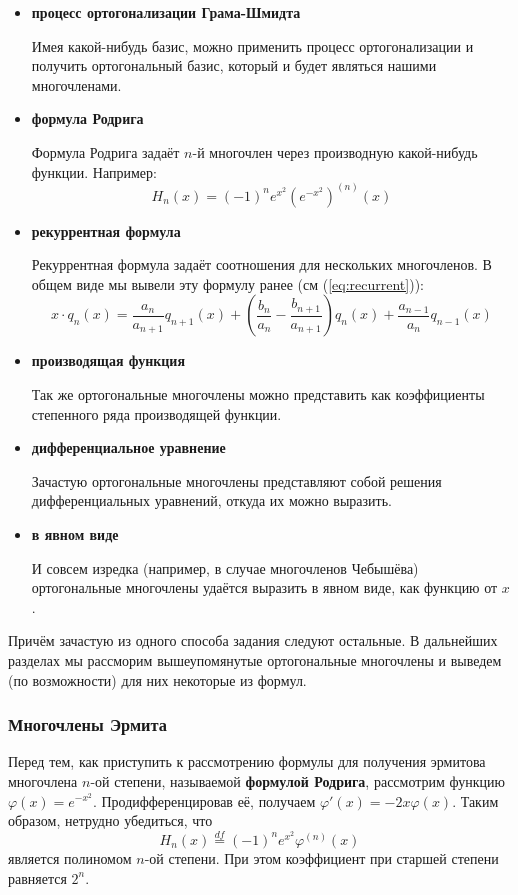 \documentclass[12pt]{article}
\begin{document}
			\begin{itemize}
				\item \textbf{процесс ортогонализации Грама-Шмидта}

				Имея какой-нибудь базис, можно применить процесс ортогонализации и получить ортогональный базис, который и будет являться нашими многочленами.

				\item \textbf{формула Родрига}

				Формула Родрига задаёт $n$-й многочлен через производную какой-нибудь функции. Например:
				$$H_n(x) = (-1)^n e^{x^2} \left(e^{-x^2}\right)^{(n)} (x)$$

				\item \textbf{рекуррентная формула}

				Рекуррентная формула задаёт соотношения для нескольких многочленов. В общем виде мы вывели
				эту формулу ранее (см (\ref{eq:recurrent})):
				$$x \cdot q_n(x) = \frac{a_n}{a_{n+1}} q_{n+1} (x) + 
					\left(\frac{b_n}{a_n} - \frac{b_{n+1}}{a_{n+1}}\right) q_n(x) + \frac{a_{n-1}}{a_n} q_{n-1}(x)$$

				\item \textbf{производящая функция}

				Так же ортогональные многочлены можно представить как коэффициенты степенного ряда
				производящей функции.

				\item \textbf{дифференциальное уравнение}

				Зачастую ортогональные многочлены представляют собой решения дифференциальных уравнений,
				откуда их можно выразить.

				\item \textbf{в явном виде}

				И совсем изредка (например, в случае многочленов Чебышёва) ортогональные многочлены удаётся
				выразить в явном виде, как функцию от $x$.

			\end{itemize}

			Причём зачастую из одного способа задания следуют остальные. В дальнейших разделах мы рассморим вышеупомянутые ортогональные многочлены и выведем (по возможности) для них некоторые из формул.

		\subsubsection{Многочлены Эрмита}

			Перед тем, как приступить к рассмотрению формулы для получения эрмитова многочлена $n$-ой степени, называемой 
			\textbf{формулой Родрига}, рассмотрим функцию $\varphi(x) = e^{-x^2}$. Продифференцировав её, получаем
			$\varphi'(x) = -2x \varphi(x)$. Таким образом, нетрудно убедиться, что
			$$H_n(x) \overset{df}{=} (-1)^n e^{x^2} \varphi^{(n)} (x)$$
			является полиномом $n$-ой степени. При этом коэффициент при старшей степени равняется $2^n$.
	
\end{document}

